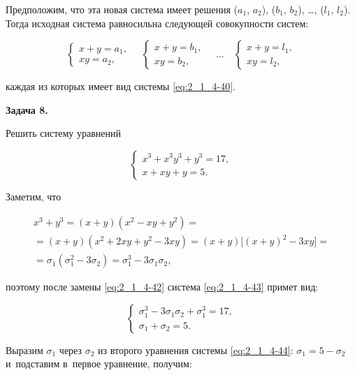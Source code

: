Предположим, что эта новая система имеет решения
($a_{1}$, $a_{2}$), ($b_{1}$, $b_{2}$), \dots, ($l_{1}$, $l_{2}$).
Тогда исходная система равносильна следующей совокупности систем:

\begin{equation*} 
\begin{cases}
x + y = a_{1}, \\
xy = a_{2},
\end{cases}
\quad
\begin{cases}
x + y = b_{1}, \\
xy = b_{2},
\end{cases}
\quad
\dots
\quad
\begin{cases}
x + y = l_{1}, \\
xy = l_{2},
\end{cases}
\end{equation*} 

\noindent
каждая из которых имеет вид системы \eqref{eq:2_1_4-40}.

\hypertarget{ex:2_1_4_8}{\textbf{Задача 8.}} Решить систему уравнений

\begin{equation}\label{eq:2_1_4-43}
\begin{cases}
x^{3} + x^{3}y^{3} + y^{3 } = 17, \\
x + xy + y = 5.
\end{cases}
\end{equation}

Заметим, что 

\begin{multline*}
x^{3} + y^{3} = (x + y)(x^{2} - xy + y^{2}) = \\
= (x + y)(x^{2} + 2xy + y^{2} - 3xy) = (x + y)\bigr[(x + y)^{2} - 3xy\bigl] = \\
= \sigma_{1}(\sigma_{1}^{2} - 3\sigma_{2}) = \sigma_{1}^{3} - 3\sigma_{1}\sigma_{2},
\end{multline*}

\noindent
поэтому после замены \eqref{eq:2_1_4-42} система \eqref{eq:2_1_4-43} примет вид:

\begin{equation}\label{eq:2_1_4-44}
\begin{cases}
\sigma_{1}^{3} - 3\sigma_{1}\sigma_{2} + \sigma_{1}^{3} = 17, \\
\sigma_{1} + \sigma_{2} = 5.
\end{cases}
\end{equation}

Выразим $\sigma_{1}$ через $\sigma_{2}$ из второго уравнения системы \eqref{eq:2_1_4-44}:
$\sigma_{1} = 5 - \sigma_{2}$ и~подставим в~первое уравнение, получим:


